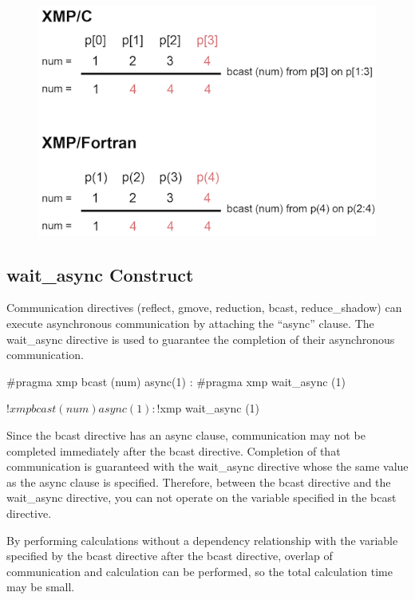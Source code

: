 \begin{figure}
  \centering
  \includegraphics{figs/bcast_from_on.png}
\end{figure}


\subsection{{\bf wait\_async} Construct}

Communication directives (reflect, gmove, reduction, bcast,
reduce\_shadow) can execute asynchronous communication by attaching the
“async” clause. The wait\_async directive is used to guarantee the
completion of their asynchronous communication.

\begin{XCexample}
#pragma xmp bcast (num) async(1)
    :
#pragma xmp wait_async (1)
\end{XCexample}

\begin{XFexample}
!$xmp bcast (num) async(1)
        :
!$xmp wait_async (1)
\end{XFexample}

Since the bcast directive has an async clause, communication may not be
completed immediately after the bcast directive. Completion of that
communication is guaranteed with the wait\_async directive whose the same
value as the async clause is specified. Therefore, between the bcast
directive and the wait\_async directive, you can not operate on the
variable specified in the bcast directive.

\begin{myhint}
By performing calculations without a dependency
relationship with the variable specified by the bcast directive after
the bcast directive, overlap of communication and calculation can be
performed, so the total calculation time may be small.
\end{myhint}

